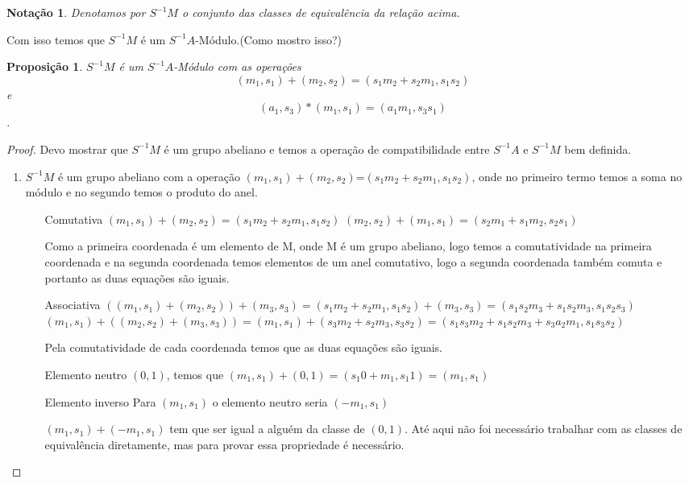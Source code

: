 \documentclass[10pt,a4paper]{article}
\newtheorem{proposition}[theorem]{Proposição}
\newtheorem{notation}[theorem]{Notação}
\begin{document}
\begin{notation}
	Denotamos por $S^{-1}M$ o conjunto das classes de equivalência da relação acima.
\end{notation}

Com isso temos que $S^{-1}M$ é um $S^{-1}A$-Módulo.(Como mostro isso?)

\begin{proposition}
	$S^{-1}M$ é um $S^{-1}A$-Módulo com as operações $$(m_1,s_1)+(m_2,s_2)=(s_1m_2+s_2m_1,s_1s_2)$$ e $$(a_1,s_3)*(m_1,s_1)=(a_1m_1,s_3s_1)$$.
\end{proposition}

\begin{proof}
	Devo mostrar que $S^{-1}M$ é um grupo abeliano e temos a operação de compatibilidade entre $S^{-1}A$ e $S^{-1}M$ bem definida.
	
	\begin{enumerate}
		\item $S^{-1}M$ é um grupo abeliano com a operação $(m_1,s_1)+(m_2,s_2)$=$(s_1m_2+s_2m_1,s_1s_2)$, onde no primeiro termo temos a soma no módulo e no segundo temos o produto do anel.
		
		\begin{enumerate}
			\item [Comutativa] $(m_1,s_1)+(m_2,s_2) = (s_1m_2+s_2m_1,s_1s_2)$
			$(m_2,s_2)+(m_1,s_1) = (s_2m_1+s_1m_2,s_2s_1)$
			
			Como a primeira coordenada é um elemento de M, onde M é um grupo abeliano, logo temos a comutatividade na primeira coordenada e na segunda coordenada temos elementos de um anel comutativo, logo a segunda coordenada também comuta e portanto as duas equações são iguais.
			
			\item [Associativa] $((m_1,s_1)+(m_2,s_2))+(m_3,s_3)=(s_1m_2+s_2m_1,s_1s_2)+(m_3,s_3)=(s_1s_2m_3+s_1s_2m_3,s_1s_2s_3)$
			$(m_1,s_1)+((m_2,s_2)+(m_3,s_3))=(m_1,s_1)+(s_3m_2+s_2m_3,s_3s_2)=(s_1s_3m_2+s_1s_2m_3+s_3a_2m_1, s_1s_3s_2)$
			
			Pela comutatividade de cada coordenada temos que as duas equações são iguais.
			
			\item[Elemento neutro] $(0,1)$, temos que $(m_1,s_1)+(0,1)=(s_1 0+m_1,s_1 1)=(m_1,s_1)$
			
			\item[Elemento inverso] Para $(m_1,s_1)$ o elemento neutro seria $(-m_1,s_1)$
			
			$(m_1,s_1)+(-m_1,s_1)$ tem que ser igual a alguém da classe de $(0,1)$. Até aqui não foi necessário trabalhar com as classes de equivalência diretamente, mas para provar essa propriedade é necessário.
			

\end{enumerate}
\end{enumerate}
\end{proof}
\end{document}
